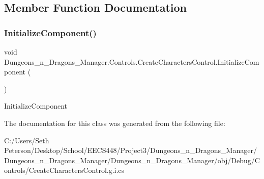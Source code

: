 \subsection{Member Function Documentation}
\mbox{\label{class_dungeons__n___dragons___manager_1_1_controls_1_1_create_characters_control_a491559e1c6f80ba14aee5dd2ea09cc87}} 
\subsubsection{\texorpdfstring{Initialize\+Component()}{InitializeComponent()}}
{\footnotesize\ttfamily void Dungeons\+\_\+n\+\_\+\+Dragons\+\_\+\+Manager.\+Controls.\+Create\+Characters\+Control.\+Initialize\+Component (\begin{DoxyParamCaption}{ }\end{DoxyParamCaption})\hspace{0.3cm}{\ttfamily [inline]}}



Initialize\+Component 



The documentation for this class was generated from the following file\+:\begin{DoxyCompactItemize}
\item 
C\+:/\+Users/\+Seth Peterson/\+Desktop/\+School/\+E\+E\+C\+S448/\+Project3/\+Dungeons\+\_\+n\+\_\+\+Dragons\+\_\+\+Manager/\+Dungeons\+\_\+n\+\_\+\+Dragons\+\_\+\+Manager/\+Dungeons\+\_\+n\+\_\+\+Dragons\+\_\+\+Manager/obj/\+Debug/\+Controls/Create\+Characters\+Control.\+g.\+i.\+cs\end{DoxyCompactItemize}
